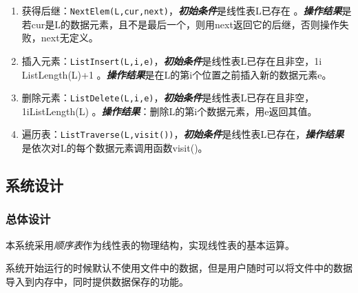 \documentclass[format=draft,language=chinese,category=academic-report]{hustreport}
\begin{document}
\begin{enumerate}
\item 获得后继：\texttt{NextElem(L,cur,next)}，\newline \textbf{\emph{初始条件}}是线性表L已存在 。\newline \textbf{\emph{操作结果}}是若cur是L的数据元素，且不是最后一个，则用next返回它的后继，否则操作失败，next无定义。
\item 插入元素：\texttt{ListInsert(L,i,e)}，\newline \textbf{\emph{初始条件}}是线性表L已存在且非空，1\le i \le ListLength(L)+1 。\newline \textbf{\emph{操作结果}}是在L的第i个位置之前插入新的数据元素e。
\item 删除元素：\texttt{ListDelete(L,i,e)}，\newline \textbf{\emph{初始条件}}是线性表L已存在且非空，1\le i\le ListLength(L) 。\newline \textbf{\emph{操作结果}}：删除L的第i个数据元素，用e返回其值。
\item 遍历表：\texttt{ListTraverse(L,visit())}，\newline \textbf{\emph{初始条件}}是线性表L已存在，\newline \textbf{\emph{操作结果}}是依次对L的每个数据元素调用函数visit()。
\end{enumerate}
\subsection{系统设计}
\subsubsection{总体设计}
本系统采用\emph{顺序表}作为线性表的物理结构，实现线性表的基本运算。
\par
系统开始运行的时候默认不使用文件中的数据，但是用户随时可以将文件中的数据导入到内存中，同时提供数据保存的功能。
\end{document}
